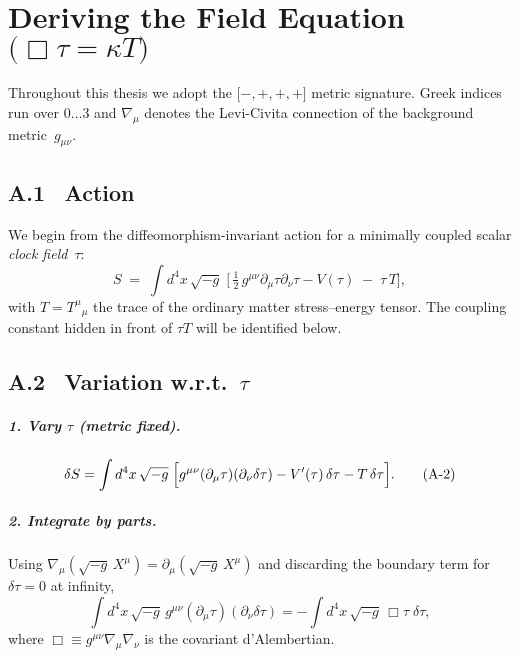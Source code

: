 \chapter{Deriving the Field Equation \texorpdfstring{$\bigl(\Box\tau=\kappa T\bigr)$}{(□τ = κT)}}

Throughout this thesis we adopt the \(\bigl[-,+,+,+\bigr]\) metric
signature.  Greek indices run over \(0\dots3\) and
\(\nabla_{\!\mu}\) denotes the Levi-Civita connection of the
background metric~\(g_{\mu\nu}\).

\section*{A.1 \, Action}

We begin from the diffeomorphism-invariant action for a minimally
coupled scalar \emph{clock field}~\(\tau\):
\begin{equation}
  S \;=\;
  \int\! d^{4}x\,\sqrt{-g}\;
     \bigl[\,
       \tfrac12\,g^{\mu\nu}\partial_{\mu}\tau\partial_{\nu}\tau
       - V(\tau)\;-\;\tau\,T
     \bigr],
  \tag{A-1}\label{A1}
\end{equation}
with \(T = T^{\mu}{}_{\mu}\) the trace of the
ordinary matter stress–energy tensor.  The coupling constant hidden in
front of \(\tau T\) will be identified below.

\section*{A.2 \, Variation w.r.t.\ $\tau$}

\paragraph{1. Vary \(\tau\) (metric fixed).}
\begin{equation}
  \delta S
  = \int d^{4}x\,\sqrt{-g}\;
      \Bigl[
         g^{\mu\nu}(\partial_{\mu}\tau)(\partial_{\nu}\delta\tau)
         - V'(\tau)\,\delta\tau
         - T\,\delta\tau
      \Bigr].
  \tag{A-2}
\end{equation}

\paragraph{2. Integrate by parts.}
Using \(\nabla_{\!\mu}(\sqrt{-g}\,X^{\mu})=
  \partial_{\mu}(\sqrt{-g}\,X^{\mu})\) and discarding the boundary
term for \(\delta\tau\!=\!0\) at infinity,
\begin{equation}
  \int d^{4}x\,\sqrt{-g}\,g^{\mu\nu}(\partial_{\mu}\tau)
                                  (\partial_{\nu}\delta\tau)
  = - \int d^{4}x\,\sqrt{-g}\,\Box\tau\;\delta\tau,
  \tag{A-3}
\end{equation}
where \(\Box \equiv g^{\mu\nu}\nabla_{\!\mu}\nabla_{\!\nu}\) is the
covariant d’Alembertian.

